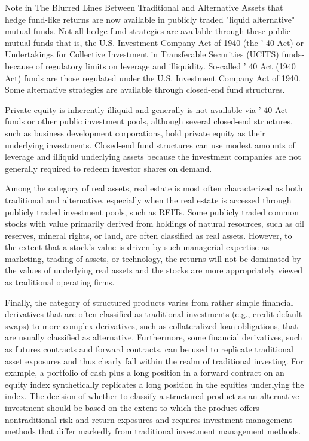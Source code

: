 \documentclass[11pt]{article}
\begin{document}
Note in The Blurred Lines Between Traditional and Alternative Assets that hedge fund-like returns are now available in publicly traded "liquid alternative" mutual funds. Not all hedge fund strategies are available through these public mutual funds-that is, the U.S. Investment Company Act of 1940 (the ' 40 Act) or Undertakings for Collective Investment in Transferable Securities (UCITS) funds-because of regulatory limits on leverage and illiquidity. So-called ' 40 Act (1940 Act) funds are those regulated under the U.S. Investment Company Act of 1940. Some alternative strategies are available through closed-end fund structures.

Private equity is inherently illiquid and generally is not available via ' 40 Act funds or other public investment pools, although several closed-end structures, such as business development corporations, hold private equity as their underlying investments. Closed-end fund structures can use modest amounts of leverage and illiquid underlying assets because the investment companies are not generally required to redeem investor shares on demand.

Among the category of real assets, real estate is most often characterized as both traditional and alternative, especially when the real estate is accessed through publicly traded investment pools, such as REITs. Some publicly traded common stocks with value primarily derived from holdings of natural resources, such as oil reserves, mineral rights, or land, are often classified as real assets. However, to the extent that a stock's value is driven by such managerial expertise as marketing, trading of assets, or technology, the returns will not be dominated by the values of underlying real assets and the stocks are more appropriately viewed as traditional operating firms.

Finally, the category of structured products varies from rather simple financial derivatives that are often classified as traditional investments (e.g., credit default swaps) to more complex derivatives, such as collateralized loan obligations, that are usually classified as alternative. Furthermore, some financial derivatives, such as futures contracts and forward contracts, can be used to replicate traditional asset exposures and thus clearly fall within the realm of traditional investing. For example, a portfolio of cash plus a long position in a forward contract on an equity index synthetically replicates a long position in the equities underlying the index. The decision of whether to classify a structured product as an alternative investment should be based on the extent to which the product offers nontraditional risk and return exposures and requires investment management methods that differ markedly from traditional investment management methods.
\end{document}
